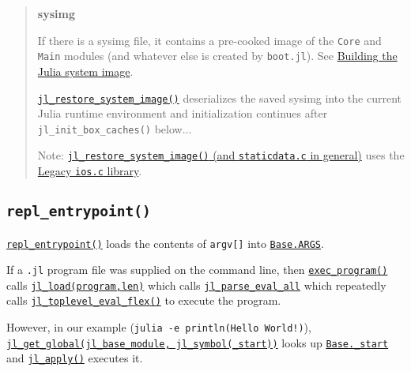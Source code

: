 \begin{quote}
\textbf{sysimg}

If there is a sysimg file, it contains a pre-cooked image of the \texttt{Core} and \texttt{Main} modules (and whatever else is created by \texttt{boot.jl}). See \hyperlink{15513456349900674098}{Building the Julia system image}.

\href{https://github.com/JuliaLang/julia/blob/master/src/staticdata.c}{\texttt{jl\_restore\_system\_image()}} deserializes the saved sysimg into the current Julia runtime environment and initialization continues after \texttt{jl\_init\_box\_caches()} below...

Note: \href{https://github.com/JuliaLang/julia/blob/master/src/staticdata.c}{\texttt{jl\_restore\_system\_image()} (and \texttt{staticdata.c} in general)} uses the \hyperlink{3841537160196121279}{Legacy \texttt{ios.c} library}.

\end{quote}


\hypertarget{11153303243704616360}{}


\subsection{\texttt{repl\_entrypoint()}}



\href{https://github.com/JuliaLang/julia/blob/master/src/jlapi.c}{\texttt{repl\_entrypoint()}} loads the contents of \texttt{argv[]} into \hyperlink{2567473177880607455}{\texttt{Base.ARGS}}.



If a \texttt{.jl} {\textquotedbl}program{\textquotedbl} file was supplied on the command line, then \href{https://github.com/JuliaLang/julia/blob/master/src/jlapi.c}{\texttt{exec\_program()}} calls \href{https://github.com/JuliaLang/julia/blob/master/src/toplevel.c}{\texttt{jl\_load(program,len)}} which calls \href{https://github.com/JuliaLang/julia/blob/master/src/ast.c}{\texttt{jl\_parse\_eval\_all}} which repeatedly calls \href{https://github.com/JuliaLang/julia/blob/master/src/toplevel.c}{\texttt{jl\_toplevel\_eval\_flex()}} to execute the program.



However, in our example (\texttt{julia -e {\textquotesingle}println({\textquotedbl}Hello World!{\textquotedbl}){\textquotesingle}}), \href{https://github.com/JuliaLang/julia/blob/master/src/module.c}{\texttt{jl\_get\_global(jl\_base\_module, jl\_symbol({\textquotedbl}\_start{\textquotedbl}))}} looks up \href{https://github.com/JuliaLang/julia/blob/master/base/client.jl}{\texttt{Base.\_start}} and \href{https://github.com/JuliaLang/julia/blob/master/src/julia.h}{\texttt{jl\_apply()}} executes it.



